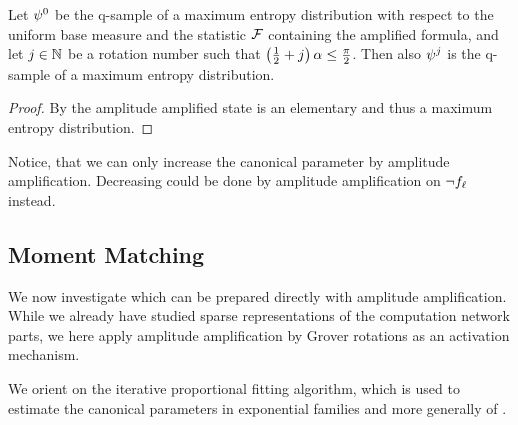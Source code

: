 \begin{theorem}
    \label{the:rotationKeepsMaxEntropy}
    Let $\psi^{0}$ be the q-sample of a maximum entropy distribution with respect to the uniform base measure and the statistic $\mathcal{F}$ containing the amplified formula, and let $j\in\mathbb{N}$ be a rotation number such that $\left(\frac{1}{2}+j\right)\alpha\leq\frac{\pi}{2}$.
    Then also $\psi^{j}$ is the q-sample of a maximum entropy distribution.
\end{theorem}
\begin{proof}%
    By  the amplitude amplified state is an elementary \ComputationActivationNetwork{} and thus a maximum entropy distribution.
\end{proof}

%
Notice, that we can only increase the canonical parameter by amplitude amplification.
Decreasing could be done by amplitude amplification on $\lnot f_{\ell}$ instead.



\subsection{Moment Matching} %

We now investigate which \ComputationActivationNetworks{} can be prepared directly with amplitude amplification.
While we already have studied sparse representations of the computation network parts, we here apply amplitude amplification by Grover rotations as an activation mechanism.

We orient on the iterative proportional fitting algorithm, which is used to estimate the canonical parameters in exponential families  \cite{wainwright_graphical_2008} and more generally of \ComputationActivationNetworks{} \cite{goessmann_tensor-network_2025}.

